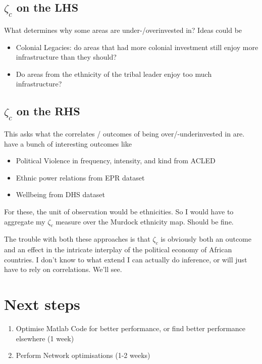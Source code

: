 \documentclass[11pt, oneside]{article}   	%
\begin{document}
\subsection{$\zeta_{c}$ on the LHS}
What determines why some areas are under-/overinvested in? Ideas could be
\begin{itemize}
  \item Colonial Legacies: do areas that had more colonial investment still enjoy more infrastructure than they should?
  \item Do areas from the ethnicity of the tribal leader enjoy too much infrastructure?
\end{itemize}

\subsection{$\zeta_{c}$ on the RHS}
This asks what the correlates / outcomes of being over/-underinvested in are. \cite{michalopoulos_long-run_2016} have a bunch of interesting outcomes like
\begin{itemize}
  \item Political Violence in frequency, intensity, and kind from ACLED
  \item Ethnic power relations from EPR dataset
  \item Wellbeing from DHS dataset
\end{itemize}

For these, the unit of observation would be ethnicities. So I would have to aggregate my $\zeta_{c}$ measure over the Murdock ethnicity map. Should be fine.

The trouble with both these approaches is that $\zeta_{c}$ is obviously both an outcome and an effect in the intricate interplay of the political economy of African countries. I don't know to what extend I can actually do inference, or will just have to rely on correlations. We'll see.


\section{Next steps}

\begin{enumerate}
  \item Optimise Matlab Code for better performance, or find better performance elsewhere (1 week)
  \item Perform Network optimisations (1-2 weeks)
\end{enumerate}
\end{document}
